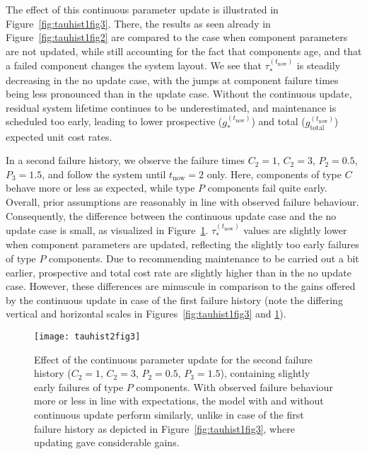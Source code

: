 \documentclass[authoryear]{elsarticle}
\def\tnow{t_\text{now}}
\newcommand{\tausnow}{\tau_*^{(\tnow)}}
\newcommand{\gstarnow}{g_*^{(\tnow)}}
\newcommand{\gtotalnow}{g_\text{total}^{(\tnow)}}
\begin{document}
The effect of this continuous parameter update is illustrated in Figure~\ref{fig:tauhist1fig3}.
There, the results as seen already in Figure~\ref{fig:tauhist1fig2} are compared
to the case when component parameters are not updated,
while still accounting for the fact that components age,
and that a failed component changes the system layout.
We see that $\tausnow$ is steadily decreasing in the no update case,
with the jumps at component failure times being less pronounced than in the update case.
Without the continuous update, residual system lifetime continues to be underestimated,
and maintenance is scheduled too early,
leading to lower prospective ($\gstarnow$) and total ($\gtotalnow$) expected unit cost rates.

In a second failure history, we observe the failure times $C_2 = 1$, $C_2 = 3$, $P_2 = 0.5$, $P_3 = 1.5$,
and follow the system until $\tnow = 2$ only.
Here, components of type $C$ behave more or less as expected,
while type $P$ components fail quite early.
Overall, prior assumptions are reasonably in line with observed failure behaviour.
Consequently, the difference between the continuous update case and the no update case is small,
as visualized in Figure~\ref{fig:tauhist2fig3}.
$\tausnow$ values are slightly lower when component parameters are updated,
reflecting the slightly too early failures of type $P$ components.
Due to recommending maintenance to be carried out a bit earlier,
prospective and total cost rate are slightly higher than in the no update case.
However, these differences are minuscule in comparison to the gains offered by the continuous update
in case of the first failure history
(note the differing vertical and horizontal scales in Figures~\ref{fig:tauhist1fig3} and \ref{fig:tauhist2fig3}).

\begin{figure}
\texttt{[image: tauhist2fig3]}
\caption{Effect of the continuous parameter update for the second failure history ($C_2 = 1$, $C_2 = 3$, $P_2 = 0.5$, $P_3 = 1.5$),
containing slightly early failures of type $P$ components.
With observed failure behaviour more or less in line with expectations,
the model with and without continuous update perform similarly,
unlike in case of the first failure history as depicted in Figure~\ref{fig:tauhist1fig3},
where updating gave considerable gains.}
\label{fig:tauhist2fig3}
\end{figure}
\end{document}

